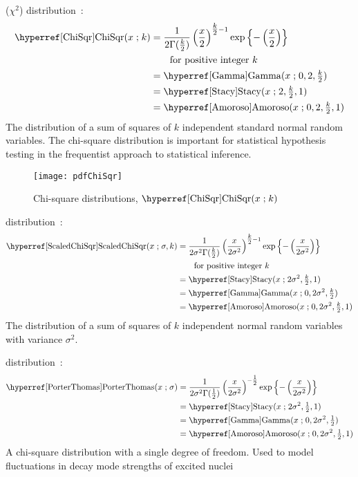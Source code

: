  ($\chi^2$)  distribution~\cite{Fisher1924,Johnson1994}:
\begin{align}
\label{ChiSqr}
\opr{ChiSqr}(x \given k) 
&= \frac{1}{2\Gamma(\tfrac{k}{2})} \left(\frac{x}{2}\right)^{\tfrac{k}{2}-1} 
\exp\left\{-\left(\frac{x}{2}\right)\right\} 	\checked
\\
& \qquad \text{for positive integer } k \notag \checked \\
&=  \opr{Gamma}(x\given  0, 2,\tfrac{k}{2}) \notag \checked \\
&=  \opr{Stacy}(x\given 2, \tfrac{k}{2},1) \notag \checked \\
&=  \opr{Amoroso}(x\given  0, 2, \tfrac{k}{2}, 1) \checked \notag 
\end{align}
The distribution of a sum of squares of $k$ independent standard normal random variables.  The chi-square distribution is important for statistical hypothesis testing in the frequentist approach to statistical inference.



\begin{figure}[t!]
\begin{center}
\texttt{[image: pdfChiSqr]}
\end{center}
\caption[Chi-square distributions]{Chi-square distributions, $\opr{ChiSqr}(x\given k)$}
\end{figure}



 distribution~\cite{Lee2012}:
\begin{align}
\label{ScaledChiSqr}
\opr{ScaledChiSqr}(x \given \sigma, k) 
&= \frac{1}{2\sigma^2\Gamma(\tfrac{k}{2})} \left(\frac{x}{2\sigma^2}\right)^{\tfrac{k}{2}-1} 
\exp\left\{-\left(\frac{x}{2\sigma^2} \right)\right\} \checked \\
& \qquad \text{for positive integer } k \notag \\
&=  \opr{Stacy}(x\given 2\sigma^2, \tfrac{k}{2},1)  \checked\notag \\
&=\opr{Gamma}(x\given 0, 2\sigma^2, \tfrac{k}{2}) \checked \notag \\
&=  \opr{Amoroso}(x\given  0, 2\sigma^2, \tfrac{k}{2}, 1) \checked \notag 
\end{align}
The distribution of a sum of squares of $k$ independent normal random variables with variance $\sigma^2$.


 distribution~\cite{Porter1956a}:
\begin{align}
\label{PorterThomas}
\opr{PorterThomas}(x \given \sigma) 
&= \frac{1}{2\sigma^2\Gamma(\tfrac{1}{2})} \left(\frac{x}{2\sigma^2}\right)^{-\tfrac{1}{2}} 
\exp\left\{-\left(\frac{x}{2\sigma^2} \right)\right\}  \\
&=  \opr{Stacy}(x\given 2\sigma^2, \tfrac{1}{2},1)  \checked\notag \\
&=\opr{Gamma}(x\given 0, 2\sigma^2, \tfrac{1}{2}) \checked \notag \\
&=  \opr{Amoroso}(x\given  0, 2\sigma^2, \tfrac{1}{2}, 1) \checked \notag 
\end{align}
A chi-square distribution with a single degree of freedom.
Used to model fluctuations in decay mode strengths of excited nuclei~\cite{Porter1956a}


